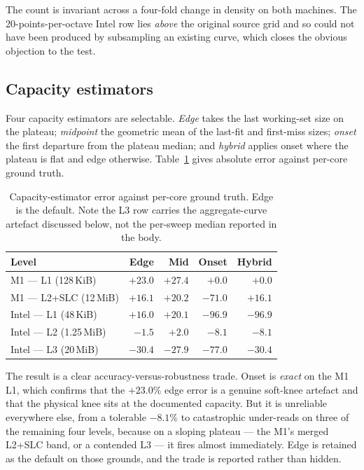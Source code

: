 \documentclass[conference]{IEEEtran}
\begin{document}
The count is invariant across a four-fold change in density on both machines. The
20-points-per-octave Intel row lies \emph{above} the original source grid and so
could not have been produced by subsampling an existing curve, which closes the
obvious objection to the test.

\subsection{Capacity estimators}

Four capacity estimators are selectable. \emph{Edge} takes the last working-set
size on the plateau; \emph{midpoint} the geometric mean of the last-fit and
first-miss sizes; \emph{onset} the first departure from the plateau median; and
\emph{hybrid} applies onset where the plateau is flat and edge otherwise.
Table~\ref{tab:estimators} gives absolute error against per-core ground truth.

\begin{table}[h]
\caption{Capacity-estimator error against per-core ground truth. Edge is the
default. Note the L3 row carries the aggregate-curve artefact discussed below,
not the per-sweep median reported in the body.}
\label{tab:estimators}
\centering
\footnotesize
\begin{tabular}{@{}lrrrr@{}}
\toprule
\textbf{Level} & \textbf{Edge} & \textbf{Mid} & \textbf{Onset} & \textbf{Hybrid} \\
\midrule
M1 --- L1 (128\,KiB)      & $+23.0$ & $+27.4$ & $\mathbf{+0.0}$ & $\mathbf{+0.0}$ \\
M1 --- L2+SLC (12\,MiB)   & $+16.1$ & $+20.2$ & $-71.0$ & $+16.1$ \\
Intel --- L1 (48\,KiB)    & $+16.0$ & $+20.1$ & $-96.9$ & $-96.9$ \\
Intel --- L2 (1.25\,MiB)  & $-1.5$  & $+2.0$  & $-8.1$  & $-8.1$ \\
Intel --- L3 (20\,MiB)    & $-30.4$ & $-27.9$ & $-77.0$ & $-30.4$ \\
\bottomrule
\end{tabular}
\end{table}

The result is a clear accuracy-versus-robustness trade. Onset is \emph{exact} on
the M1 L1, which confirms that the $+23.0\%$ edge error is a genuine soft-knee
artefact and that the physical knee sits at the documented capacity. But it is
unreliable everywhere else, from a tolerable $-8.1\%$ to catastrophic under-reads
on three of the remaining four levels, because on a sloping plateau --- the M1's
merged L2+SLC band, or a contended L3 --- it fires almost immediately. Edge is
retained as the default on those grounds, and the trade is reported rather than
hidden.
\end{document}
